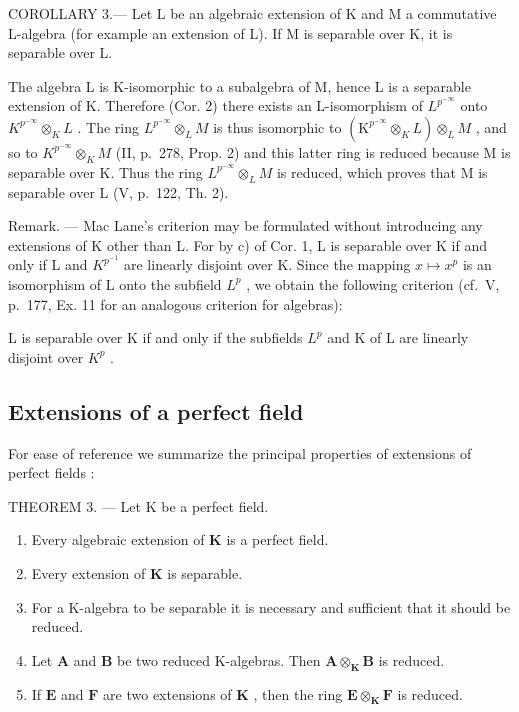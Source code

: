 COROLLARY 3.--- Let L be an algebraic extension of K and M a commutative L-algebra (for example an extension of L). If M is separable over K, it is separable over L.

The algebra L is K-isomorphic to a subalgebra of M, hence L is a separable extension of K. Therefore (Cor. 2) there exists an L-isomorphism of \(L^{p^{-\infty}}\) onto \(K^{p^{-\infty}} \otimes_{K} L\) . The ring \(L^{p^{-\infty}} \otimes_{L} M\) is thus isomorphic to \((\mathrm{K}^{p^{-\infty}} \otimes_{K} L) \otimes_{L} M\) , and so to \(K^{p^{-\infty}} \otimes_{K} M\) (II, p.~278, Prop. 2) and this latter ring is reduced because M is separable over K. Thus the ring \(L^{p^{-\infty}} \otimes_{L} M\) is reduced, which proves that M is separable over L (V, p.~122, Th. 2).

Remark. --- Mac Lane's criterion may be formulated without introducing any extensions of K other than L. For by c) of Cor. 1, L is separable over K if and only if L and \(K^{p^{-1}}\) are linearly disjoint over K. Since the mapping \(x \mapsto x^{p}\) is an isomorphism of L onto the subfield \(L^{p}\) , we obtain the following criterion (cf.~V, p.~177, Ex. 11 for an analogous criterion for algebras):

L is separable over K if and only if the subfields \(L^{p}\) and K of L are linearly disjoint over \(K^{p}\) .

\subsection{Extensions of a perfect field}

For ease of reference we summarize the principal properties of extensions of perfect fields :

THEOREM 3. --- Let K be a perfect field.

\begin{enumerate}
\def\labelenumi{\alph{enumi})}
\item
  Every algebraic extension of \(\mathbf{K}\) is a perfect field.
\item
  Every extension of \(\mathbf{K}\) is separable.
\item
  For a K-algebra to be separable it is necessary and sufficient that it should be reduced.
\item
  Let \(\mathbf{A}\) and \(\mathbf{B}\) be two reduced K-algebras. Then \(\mathbf{A} \otimes_{\mathbf{K}} \mathbf{B}\) is reduced.
\item
  If \(\mathbf{E}\) and \(\mathbf{F}\) are two extensions of \(\mathbf{K}\) , then the ring \(\mathbf{E} \otimes_{\mathbf{K}} \mathbf{F}\) is reduced.
\end{enumerate}

